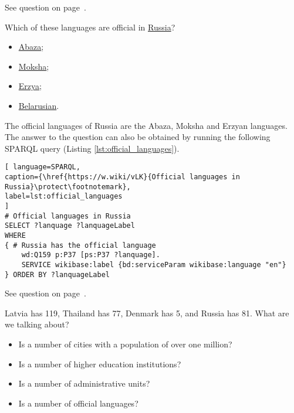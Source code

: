 See question on page~\pageref{question:old_countries}.
\begin{exercise}
\label{answer:official_languages}
Which of these languages are official in \href{https://en.wikipedia.org/wiki/Russia}{Russia}?
\begin{itemize}
\item \href{https://en.wikipedia.org/wiki/Abaza_language}{Abaza};
\item \href{https://en.wikipedia.org/wiki/Moksha_language}{Moksha};
\item \href{https://en.wikipedia.org/wiki/Erzya_language}{Erzya};
\item \href{https://en.wikipedia.org/wiki/Belarusian_language}{Belarusian}.
\end{itemize}
\end{exercise}

The official languages of Russia are the Abaza, Moksha and Erzyan languages. The answer to the question can also be obtained by running the following SPARQL query (Listing \ref{lst:official_languages}).

\begin{lstlisting}[ language=SPARQL, 
caption={\href{https://w.wiki/vLK}{Official languages in Russia}\protect\footnotemark},
label=lst:official_languages
]
# Official languages in Russia
SELECT ?lanquage ?lanquageLabel
WHERE
{ # Russia has the official language
	wd:Q159 p:P37 [ps:P37 ?lanquage].
	SERVICE wikibase:label {bd:serviceParam wikibase:language "en"}
} ORDER BY ?lanquageLabel
\end{lstlisting}

See question on page~\pageref{question:official_language}.
\begin{exercise}
\label{answer:administrative_territorial}

Latvia has 119, Thailand has 77, Denmark has 5, and Russia has 81. What are we talking about?
\begin{itemize}
\item Is a number of cities with a population of over one million?
\item Is a number of higher education institutions?
\item Is a number of administrative units?
\item Is a number of official languages?
\end{itemize}

\end{exercise}

